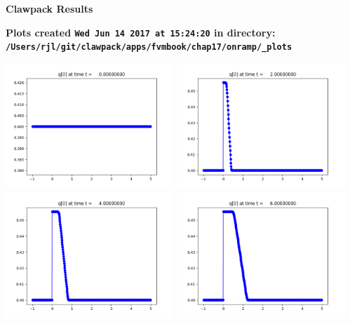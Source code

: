\documentclass[11pt]{article}
\begin{document}
        \begin{center}{\Large\bf Clawpack Results}\vskip 5pt
        
        \bf Plots created {\tt Wed Jun 14 2017 at 15:24:20} in directory: \vskip 5pt
        \verb+/Users/rjl/git/clawpack/apps/fvmbook/chap17/onramp/_plots+
        \end{center}
        \vskip 5pt
        \includegraphics[width=0.475\textwidth]{frame0000fig0.png}
\vskip 10pt 
\includegraphics[width=0.475\textwidth]{frame0001fig0.png}
\vskip 10pt 
\includegraphics[width=0.475\textwidth]{frame0002fig0.png}
\vskip 10pt 
\includegraphics[width=0.475\textwidth]{frame0003fig0.png}
\end{document}
